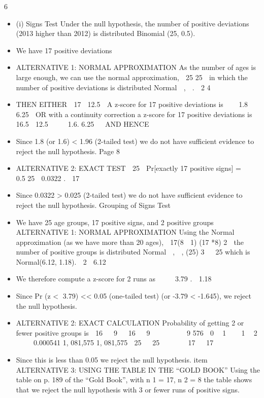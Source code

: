 \documentclass[a4paper,12pt]{article}
\begin{document}
\newpage
6
\begin{itemize}
\item (i)
Signs Test
Under the null hypothesis, the number of positive deviations (2013 higher than
2012) is distributed Binomial (25, 0.5).
\item We have 17 positive deviations
\item ALTERNATIVE 1: NORMAL APPROXIMATION
As the number of ages is large enough, we can use the normal approximation,
 25 25 
in which the number of positive deviations is distributed Normal  ,  .
 2 4 
\item THEN EITHER
 17  12.5 
A z-score for 17 positive deviations is 
  1.8
 6.25 
OR
with a continuity correction a z-score for 17 positive deviations is
 16.5  12.5 

  1.6.
6.25 

AND HENCE
\item Since 1.8 (or 1.6) < 1.96 (2-tailed test)
we do not have sufficient evidence to reject the null hypothesis.
Page 8 %
\item ALTERNATIVE 2: EXACT TEST
 25 
Pr[exactly 17 positive signs] =   0.5 25  0.0322 .
 17 
\item 
Since 0.0322 > 0.025 (2-tailed test)
we do not have sufficient evidence to reject the null hypothesis.
Grouping of Signs Test
\item We have 25 age groups, 17 positive signs, and 2 positive groups
ALTERNATIVE 1: NORMAL APPROXIMATION
Using the Normal approximation (as we have more than 20 ages),
 17(8  1) (17 *8) 2 
the number of positive groups is distributed Normal 
,
 ,
(25) 3 
 25
which is Normal(6.12, 1.18).
 2  6.12 
\item We therefore compute a z-score for 2 runs as 
   3.79 .
 1.18 
\item Since Pr (z < 3.79) << 0.05 (one-tailed test) (or -3.79 < -1.645),
we reject the null hypothesis.
\item ALTERNATIVE 2: EXACT CALCULATION
Probability of getting 2 or fewer positive groups is
 16   9   16   9 
     
9
576
 0  1    1  2  

 0.000541
1, 081,575 1, 081,575
 25 
 25 
 
 
 17 
 17 
\item Since this is less than 0.05
we reject the null hypothesis.
item ALTERNATIVE 3: USING THE TABLE IN THE “GOLD BOOK”
Using the table on p. 189 of the “Gold Book”, with n 1 = 17, n 2 = 8
the table shows that we reject the null hypothesis with 3 or fewer runs of
positive signs.

\end{itemize}
\end{document}
